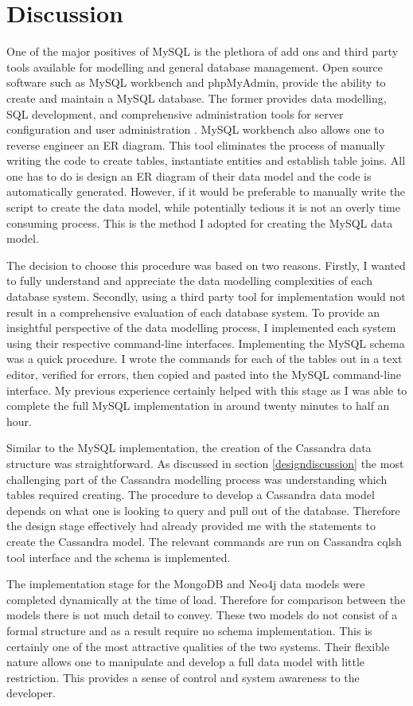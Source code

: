 \section{Discussion}\label{schemadiscussion}
One of the major positives of MySQL is the plethora of add ons and third party tools available for modelling and general database management. Open source software such as MySQL workbench and phpMyAdmin, provide the ability to create and maintain a MySQL database. The former provides data modelling, SQL development, and comprehensive administration tools for server configuration and user administration \cite{mysqlworkbench}. MySQL workbench also allows one to reverse engineer an ER diagram. This tool eliminates the process of manually writing the code to create tables, instantiate entities and establish table joins. All one has to do is design an ER diagram of their data model and the code is automatically generated. However, if it would be preferable to manually write the script to create the data model, while potentially tedious it is not an overly time consuming process. This is the method I adopted for creating the MySQL data model.

The decision to choose this procedure was based on two reasons. Firstly, I wanted to fully understand and appreciate the data modelling complexities of each database system. Secondly, using a third party tool for implementation would not result in a comprehensive evaluation of each database system. To provide an insightful perspective of the data modelling process, I implemented each system using their respective command-line interfaces. Implementing the MySQL schema was a quick procedure. I wrote the commands for each of the tables out in a text editor, verified for errors, then copied and pasted into the MySQL command-line interface. My previous experience certainly helped with this stage as I was able to complete the full MySQL implementation in around twenty minutes to half an hour. 

Similar to the MySQL implementation, the creation of the Cassandra data structure was straightforward. As discussed in section \ref{designdiscussion} the most challenging part of the Cassandra modelling process was understanding which tables required creating. The procedure to develop a Cassandra data model depends on what one is looking to query and pull out of the database. Therefore the design stage effectively had already provided me with the statements to create the Cassandra model. The relevant commands  are run on Cassandra cqlsh tool interface and the schema is implemented.

The implementation stage for the MongoDB and Neo4j data models were completed dynamically at the time of load. Therefore for comparison between the models there is not much detail to convey. These two models do not consist of a formal structure and as a result require no schema implementation. This is certainly one of the most attractive qualities of the two systems. Their flexible nature allows one to manipulate and develop a full data model with little restriction. This provides a sense of control and system awareness to the developer.


